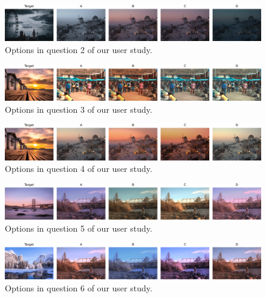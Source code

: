 \begin{figure}[ht]
    \centering
    \includegraphics[width=1\linewidth]{figures/user_study/question_2.png}
    \caption{Options in question 2 of our user study.}
    \label{fig:appendix-user-study-q2}
\end{figure}

\begin{figure}[ht]
    \centering
    \includegraphics[width=1\linewidth]{figures/user_study/question_3.png}
    \caption{Options in question 3 of our user study.}
    \label{fig:appendix-user-study-q3}
\end{figure}


\begin{figure}[ht]
    \centering
    \includegraphics[width=1\linewidth]{figures/user_study/question_4.png}
    \caption{Options in question 4 of our user study.}
    \label{fig:appendix-user-study-q4}
\end{figure}



\begin{figure}[ht]
    \centering
    \includegraphics[width=1\linewidth]{figures/user_study/question_5.png}
    \caption{Options in question 5 of our user study.}
    \label{fig:appendix-user-study-q5}
\end{figure}



\begin{figure}[ht]
    \centering
    \includegraphics[width=1\linewidth]{figures/user_study/question_6.png}
    \caption{Options in question 6 of our user study.}
    \label{fig:appendix-user-study-q6}
\end{figure}



